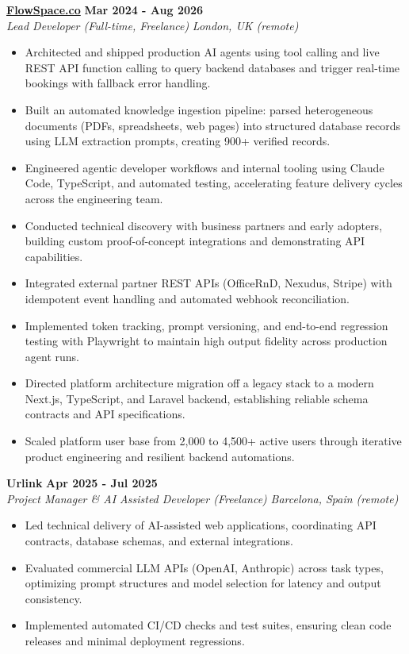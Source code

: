 \documentclass[10pt,a4paper]{article}
\newcommand{\role}[4]{%
  \textbf{#1} \hfill \textbf{#2}\\[1pt]%
  \textit{#3} \hfill \textit{#4}\\[2pt]%
}
\begin{document}
\role{\href{https://flowspace.co}{FlowSpace.co}}{Mar 2024 - Aug 2026}{Lead Developer (Full-time, Freelance)}{London, UK (remote)}
\begin{itemize}
  \item Architected and shipped production AI agents using tool calling and live REST API function calling to query backend databases and trigger real-time bookings with fallback error handling.
  \item Built an automated knowledge ingestion pipeline: parsed heterogeneous documents (PDFs, spreadsheets, web pages) into structured database records using LLM extraction prompts, creating 900+ verified records.
  \item Engineered agentic developer workflows and internal tooling using Claude Code, TypeScript, and automated testing, accelerating feature delivery cycles across the engineering team.
  \item Conducted technical discovery with business partners and early adopters, building custom proof-of-concept integrations and demonstrating API capabilities.
  \item Integrated external partner REST APIs (OfficeRnD, Nexudus, Stripe) with idempotent event handling and automated webhook reconciliation.
  \item Implemented token tracking, prompt versioning, and end-to-end regression testing with Playwright to maintain high output fidelity across production agent runs.
  \item Directed platform architecture migration off a legacy stack to a modern Next.js, TypeScript, and Laravel backend, establishing reliable schema contracts and API specifications.
  \item Scaled platform user base from 2,000 to 4,500+ active users through iterative product engineering and resilient backend automations.
\end{itemize}

\role{Urlink}{Apr 2025 - Jul 2025}{Project Manager \& AI Assisted Developer (Freelance)}{Barcelona, Spain (remote)}
\begin{itemize}
  \item Led technical delivery of AI-assisted web applications, coordinating API contracts, database schemas, and external integrations.
  \item Evaluated commercial LLM APIs (OpenAI, Anthropic) across task types, optimizing prompt structures and model selection for latency and output consistency.
  \item Implemented automated CI/CD checks and test suites, ensuring clean code releases and minimal deployment regressions.
\end{itemize}
\end{document}
